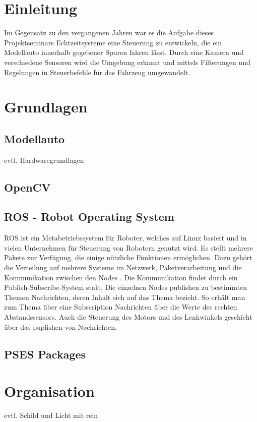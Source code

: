 \chapter{Einleitung}
\label{cha:einleitung}
Im Gegensatz zu den vergangenen Jahren war es die Aufgabe dieses Projektseminars Echtzeitsysteme eine Steuerung zu entwickeln, die ein Modellauto innerhalb gegebener Spuren fahren lässt. Durch eine Kamera und verschiedene Sensoren wird die Umgebung erkannt und mittels Filterungen und Regelungen in Steuerbefehle für das Fahrzeug umgewandelt.


\chapter{Grundlagen}
\label{cha:grundlagen}
\section{Modellauto}
\label{sec:modellauto}
evtl. Hardwaregrundlagen
\section{OpenCV}
\label{sec:openCV}
\section{ROS - Robot Operating System}
\label{sec:ros}
ROS ist ein Metabetriebssystem für Roboter, welches auf Linux basiert und in vielen Unternehmen für Steuerung von Robotern genutzt wird. Es stellt mehrere Pakete zur Verfügung, die einige nützliche Funktionen ermöglichen. Dazu gehört die Verteilung auf mehrere Systeme im Netzwerk, Paketverarbeitung und die Kommunikation zwischen den Nodes \cite{einfuehrungROS}.
Die Kommunikation findet durch ein Publish-Subscribe-System statt. Die einzelnen Nodes publishen zu  bestimmten Themen Nachrichten, deren Inhalt sich auf das Thema bezieht. So erhält man zum Thema  über eine Subscription Nachrichten über die Werte des rechten Abstandssensors. Auch die Steuerung des Motors und des Lenkwinkels geschieht über das puplishen von Nachrichten. 

\section{PSES Packages}
\label{sec:psespackages}

\chapter{Organisation}
\label{cha:organisation}
evtl. Schild und Licht mit rein
